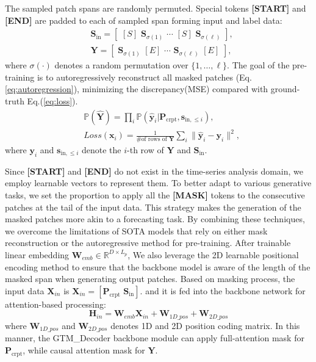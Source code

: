 The sampled patch spans are randomly permuted.  
Special tokens \textbf{[START]} and \textbf{[END]} are padded 
to each of sampled span forming input and label data: 
\begin{align}
& 
\bm{S}_{\text{in}}  
= 
[ \,\, [S] \,\, \bm{S}_{\sigma(1)} \,\,\cdots\,\, 
[S] \,\, \bm{S}_{\sigma(\ell)} \,\,
],  
\\
&
\bm{Y} 
= 
[ \, \, \bm{S}_{\sigma(1)} \,\,  [E] \,\, \cdots \,\,
\bm{S}_{\sigma(\ell)} \,\, [E] \,\,
],   
\end{align}
where $\sigma(\cdot)$ denotes a random permutation 
over $\{1,\ldots,\ell\}$.  
The goal of the pre-training is to autoregressively reconstruct all masked patches (Eq.\ref{eq:autoregression}), minimizing the discrepancy(MSE) compared with ground-truth Eq.(\ref{eq:loss}).
\begingroup
\allowdisplaybreaks
\begin{align} 
&
\mathbb{P} 
(\widehat{\bm{Y}}) 
=
\prod\nolimits_{i} 
\mathbb{P} ( \widehat{\bm{y}}_{i} 
| 
\bm{P}_{\text{crpt}}, \bm{s}_{\text{in}, \leq i}),
\label{eq:autoregression}
\\
& 
    Loss (\bm{x}_i)
    = \frac{1}{\text{\# of rows of } \bm{Y}} 
    \sum\nolimits_{i} 
\| \widehat{\bm{y}}_i - \bm{y}_i \|^2,
\label{eq:loss}
\end{align}
\endgroup
where $\bm{y}_{i}$ and $\bm{s}_{\text{in}, \leq i}$ denote the 
$i$-th row of $\bm{Y}$ and $\bm{S}_{\text{in}}$.  

Since \textbf{[START]} and \textbf{[END]} do not exist in the time-series analysis domain, 
we employ learnable vectors to represent them.   
To better adapt to various generative tasks, we set the proportion to apply all the \textbf{[MASK]} tokens to the consecutive patches at the tail of the input data. 
This strategy makes the generation of the masked patches more akin to a forecasting task.
By combining these techniques, we overcome the limitations of SOTA models that rely on either mask reconstruction or the autoregressive method for pre-training.
After trainable linear embedding $\bm{W}_{emb}\in\mathbb{R}^{D\times L_p}$, We also leverage the 2D learnable positional encoding method \cite{Du22} to ensure that the backbone model is aware of the length of the masked span when generating output patches. 
Based on masking process, the input data $\bm{X}_{in}$ 
is $
\bm{X}_{in} 
= 
[\bm{P}_{\text{crpt}} \,\, \bm{S}_{\text{in}} ].    
$ 
and it is fed into the backbone network for attention-based processing: 
\begin{equation} 
\label{eq:2D-PE}
\bm{H}_{in} = 
\bm{W}_{emb} \bm{X}_{in} + 
\bm{W}_{1D\_pos} + \bm{W}_{2D\_pos}
\end{equation}
where $\bm{W}_{1D\_pos}$ and $\bm{W}_{2D\_pos}$ 
denotes 1D and 2D position coding matrix.  
In this manner, the GTM\_Decoder backbone module can apply full-attention mask for $\bm{P}_{\text{crpt}}$, while causal attention mask for $\bm{Y}$. 

